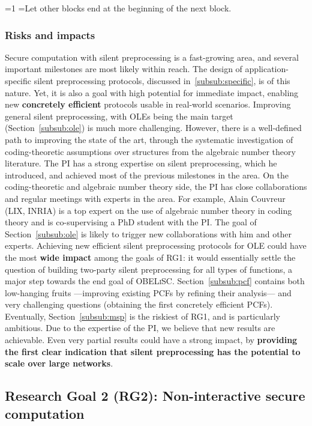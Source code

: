 \documentclass[oneside, a4paper, onecolumn, 11pt]{article}
\newcommand{\OBELiSC}{\textsc{OBELiSC}\xspace}
\newcounter{alphasect}
\def\alphainsection{0}
\newenvironment{alphasection}{%
  \ifnum\alphainsection=1%
    \errhelp={Let other blocks end at the beginning of the next block.}
    \errmessage{Nested Alpha section not allowed}
  \fi%
  \setcounter{alphasect}{0}
  \def\alphainsection{1}
}{%
  \setcounter{alphasect}{0}
  \def\alphainsection{0}
}%
\begin{document}
\begin{alphasection}
\subsubsection{Risks and impacts}

Secure computation with silent preprocessing is a fast-growing area, and several important milestones are most likely within reach. The design of application-specific silent preprocessing protocols, discussed in~\ref{subsub:specific}, is of this nature. Yet, it is also a goal with high potential for immediate impact, enabling new \textbf{concretely efficient} protocols usable in real-world scenarios. Improving general silent preprocessing, with OLEs being the main target (Section~\ref{subsub:ole}) is much more challenging. However, there is a well-defined path to improving the state of the art, through the systematic investigation of coding-theoretic assumptions over structures from the algebraic number theory literature. The PI has a strong expertise on silent preprocessing, which he introduced, and achieved most of the previous milestones in the area. On the coding-theoretic and algebraic number theory side, the PI has close collaborations and regular meetings with experts in the area. For example, Alain Couvreur (LIX, INRIA) is a top expert on the use of algebraic number theory in coding theory and is co-supervising a PhD student with the PI. The goal of Section~\ref{subsub:ole} is likely to trigger new collaborations with him and other experts. Achieving new efficient silent preprocessing protocols for OLE could have the most \textbf{wide impact} among the goals of RG1: it would essentially settle the question of building two-party silent preprocessing for all types of functions, a major step towards the end goal of \OBELiSC. Section~\ref{subsub:pcf} contains both low-hanging fruits ---improving existing PCFs by refining their analysis--- and very challenging questions (obtaining the first concretely efficient PCFs). Eventually, Section~\ref{subsub:msp} is the riskiest of RG1, and is particularly ambitious. Due to the expertise of the PI, we believe that new results are achievable. Even very partial results could have a strong impact, by \textbf{providing the first clear indication that silent preprocessing has the potential to scale over large networks}.

\subsection{Research Goal 2 (RG2): Non-interactive secure computation}


\end{alphasection}
\end{document}

